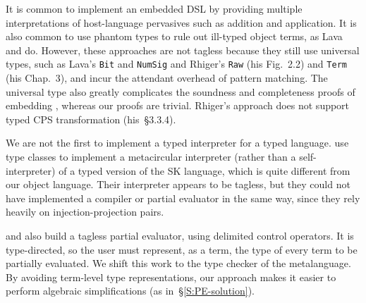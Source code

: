 It is common to implement an embedded DSL by providing multiple
interpretations of host\hyp language pervasives such as addition and
application.  It is also common to use phantom types to rule out
ill-typed object terms, as Lava
\cite{Lava} and \citet{Rhiger-thesis} do. However, these approaches
are not tagless because they still use universal types, such as Lava's
\texttt{Bit} and \texttt{NumSig} and Rhiger's \texttt{Raw} (his Fig.~2.2)
and \texttt{Term} (his Chap.~3), and incur the attendant overhead of
pattern matching.  The universal type also
greatly complicates the soundness and completeness proofs of embedding
\cite{Rhiger-thesis}, whereas our proofs are trivial.
Rhiger's approach does not support typed CPS transformation (his~\S3.3.4).
\begin{comment}
Rhiger's But Fig 2.2, p33: universal type Raw.  He uses phantom type
upon the Exp datatype. But that is cheating: phantom type means
essentially we can easily do coerce. We use real types.  That's why he
had to do tedious proofs in Sec 2 of soundness and completeness of
embedding. Whereas our proofs are obvious.  His sec 3 is based on data
representation of terms. They have type tags.  We do nothing of that
kind: See Sec 3.1.2. See numerous "data Term" in Sec3, which is the U
type.  In Sec 3.3.4 (p76) Rhiger specifically says that his encoding
cannot do typed CPS transformation -- whereas our does. BTW, Rhiger
thesis contains the definitions of the interpreter and the compiler,
in the beginning. Use this in response to Rev1)
\end{comment}


We are not the first to implement a typed interpreter for a typed
language.   use type classes to implement a metacircular
interpreter (rather than a self\hyp interpreter) of a
typed version of the SK language, which is quite different from our
object language.  Their interpreter
appears to be tagless, but they could not have implemented a
compiler or partial evaluator in the same way, since they rely
heavily on injection\hyp projection pairs.

 and \citet{balat:tdpe-popl2004} also build
a tagless partial evaluator, using delimited control operators.  It is
type-directed, so the user must represent, as a term, the type of every
term to be partially evaluated.  We shift this work to the type checker
of the metalanguage.  By avoiding term-level type representations, our
approach makes it easier to perform algebraic simplifications (as
in~\S\ref{S:PE-solution}).


